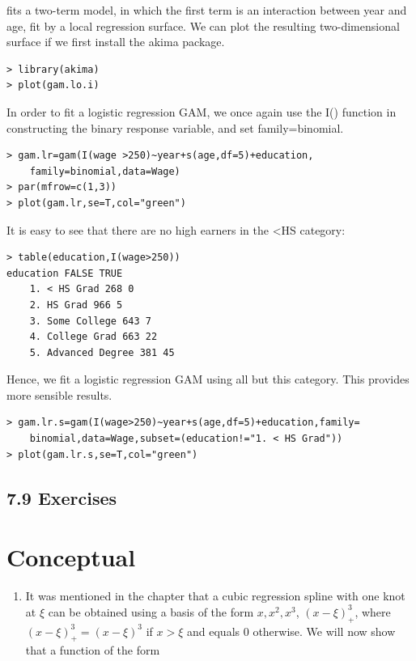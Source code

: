 \documentclass[10pt]{article}
\begin{document}
fits a two-term model, in which the first term is an interaction between year and age, fit by a local regression surface. We can plot the resulting two-dimensional surface if we first install the akima package.

\begin{verbatim}
> library(akima)
> plot(gam.lo.i)
\end{verbatim}

In order to fit a logistic regression GAM, we once again use the I() function in constructing the binary response variable, and set family=binomial.

\begin{verbatim}
> gam.lr=gam(I(wage >250)~year+s(age,df=5)+education,
    family=binomial,data=Wage)
> par(mfrow=c(1,3))
> plot(gam.lr,se=T,col="green")
\end{verbatim}

It is easy to see that there are no high earners in the <HS category:

\begin{verbatim}
> table(education,I(wage>250))
education FALSE TRUE
    1. < HS Grad 268 0
    2. HS Grad 966 5
    3. Some College 643 7
    4. College Grad 663 22
    5. Advanced Degree 381 45
\end{verbatim}

Hence, we fit a logistic regression GAM using all but this category. This provides more sensible results.

\begin{verbatim}
> gam.lr.s=gam(I(wage>250)~year+s(age,df=5)+education,family=
    binomial,data=Wage,subset=(education!="1. < HS Grad"))
> plot(gam.lr.s,se=T,col="green")
\end{verbatim}

\subsection*{7.9 Exercises}
\section*{Conceptual}
\begin{enumerate}
  \item It was mentioned in the chapter that a cubic regression spline with one knot at $\xi$ can be obtained using a basis of the form $x, x^{2}, x^{3}$, $(x-\xi)_{+}^{3}$, where $(x-\xi)_{+}^{3}=(x-\xi)^{3}$ if $x>\xi$ and equals 0 otherwise. We will now show that a function of the form
\end{enumerate}
\end{document}
